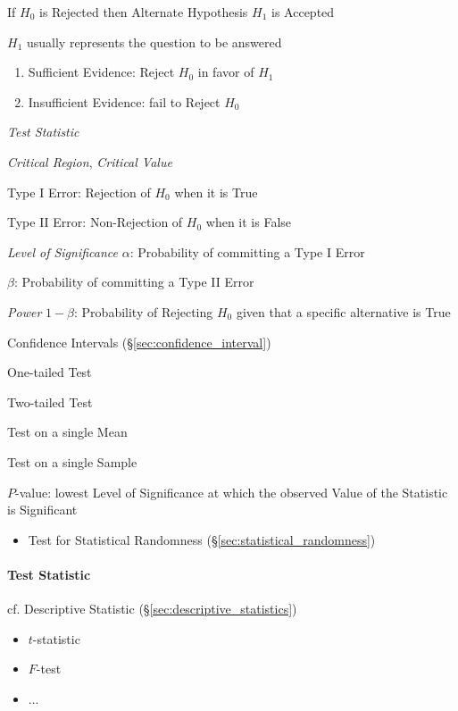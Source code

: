 If $H_0$ is Rejected then Alternate Hypothesis $H_1$ is Accepted

$H_1$ usually represents the question to be answered

\begin{enumerate}
  \item Sufficient Evidence: Reject $H_0$ in favor of $H_1$
  \item Insufficient Evidence: fail to Reject $H_0$
\end{enumerate}

\emph{Test Statistic}

\emph{Critical Region}, \emph{Critical Value}

Type I Error: Rejection of $H_0$ when it is True

Type II Error: Non-Rejection of $H_0$ when it is False

\emph{Level of Significance} $\alpha$: Probability of committing a
Type I Error

$\beta$: Probability of committing a Type II Error

\emph{Power} $1 - \beta$: Probability of Rejecting $H_0$ given that a
specific alternative is True

Confidence Intervals (\S\ref{sec:confidence_interval})

One-tailed Test

Two-tailed Test

Test on a single Mean

Test on a single Sample

$P$-value: lowest Level of Significance at which the observed Value of
the Statistic is Significant

\begin{itemize}
  \item Test for Statistical Randomness (\S\ref{sec:statistical_randomness})
\end{itemize}



\paragraph{Test Statistic}\label{sec:test_statistic}\hfill

cf. Descriptive Statistic (\S\ref{sec:descriptive_statistics})

\begin{itemize}
  \item $t$-statistic
  \item $F$-test
  \item ...
\end{itemize}




